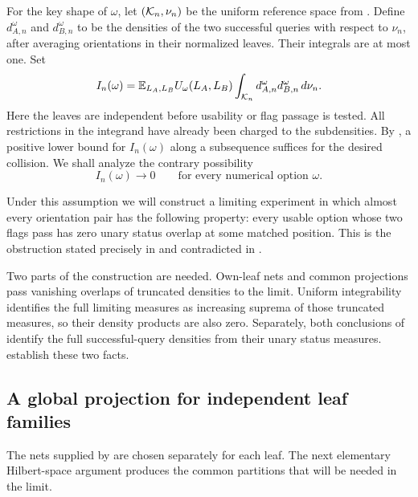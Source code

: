 For the key shape of $\omega$, let $(\mathcal K_n,\nu_n)$ be the uniform
reference space from . Define $d_{A,n}^\omega$ and
$d_{B,n}^\omega$ to be the densities of the two successful queries with
respect to $\nu_n$, after averaging orientations in their normalized
leaves. Their integrals are at most one. Set
\begin{equation}
\label{eq:limit-option-overlap}
I_n(\omega)=
\mathbb E_{L_A,L_B} U_\omega(L_A,L_B)
\int_{\mathcal K_n}d_{A,n}^\omega d_{B,n}^\omega\,d\nu_n.
\end{equation}
Here the leaves are independent before usability or flag passage is
tested. All restrictions in the integrand have already been charged to
the subdensities. By , a positive lower bound for
$I_n(\omega)$ along a subsequence suffices for the desired collision.
We shall analyze the contrary possibility
\begin{equation}
\label{eq:limit-vanishing-overlap}
I_n(\omega)\longrightarrow0\qquad\text{for every numerical option }\omega.
\end{equation}

Under this assumption we will construct a limiting experiment in which
almost every orientation pair has the following property: every usable
option whose two flags pass has zero unary status overlap at some matched
position. This is the obstruction stated precisely in
 and contradicted in .

Two parts of the construction are needed. Own-leaf nets and common
projections pass vanishing overlaps of truncated densities to the limit.
Uniform integrability identifies the full limiting measures as increasing
suprema of those truncated measures, so their density products are also
zero. Separately, both conclusions of  identify the
full successful-query densities from their unary status measures.
 establish these two facts.

\subsection{A global projection for independent leaf families}

The nets supplied by  are chosen separately
for each leaf. The next elementary Hilbert-space argument produces the
common partitions that will be needed in the limit.


